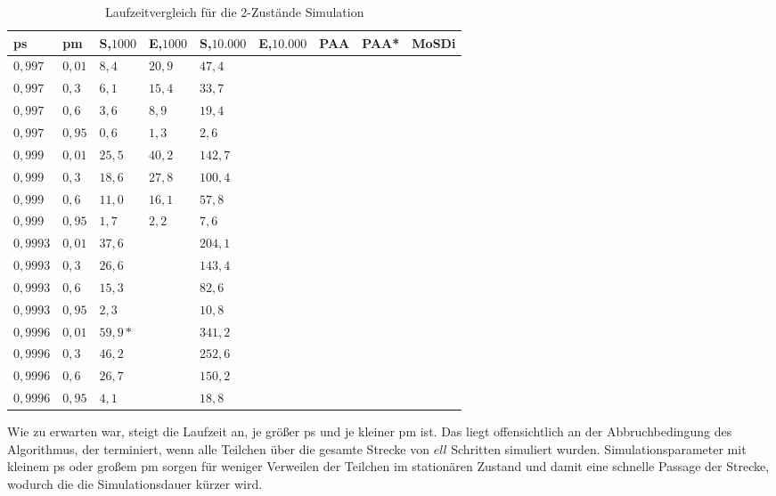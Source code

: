 \begin{table}[h]
\centering
\caption{Laufzeitvergleich für die 2-Zustände Simulation}
\label{2s_laufzeit}
\begin{tabular}{|l|l||l|l|l|l|l|l|l|} \hline
ps     & pm   & S,$1000$ & E,$1000$ & S,$10.000$ & E,$10.000$ & PAA & PAA* & MoSDi \\ \hline \hline
$0,997  $ & $ 0,01 $ & $ 8,4  $ & $ 20,9 $ & $ 47,4  $ & $  $ & $  $ & $ $ & $  $\\ \hline
$0,997  $ & $ 0,3  $ & $ 6,1  $ & $ 15,4 $ & $ 33,7  $ & $  $ & $  $ & $ $ & $  $\\ \hline
$0,997  $ & $ 0,6  $ & $ 3,6  $ & $ 8,9 $ & $ 19,4  $ & $  $ & $  $ & $ $ & $  $\\ \hline
$0,997  $ & $ 0,95 $ & $ 0,6  $ & $ 1,3 $ & $ 2,6   $ & $  $ & $  $ & $ $ & $  $\\ \hline
$0,999  $ & $ 0,01 $ & $ 25,5 $ & $ 40,2 $ & $ 142,7 $ & $  $ & $  $ & $ $ & $  $\\ \hline
$0,999  $ & $ 0,3  $ & $ 18,6 $ & $ 27,8 $ & $ 100,4 $ & $  $ & $  $ & $ $ & $  $\\ \hline
$0,999  $ & $ 0,6  $ & $ 11,0 $ & $ 16,1 $ & $ 57,8  $ & $  $ & $  $ & $ $ & $  $\\ \hline
$0,999  $ & $ 0,95 $ & $ 1,7  $ & $ 2,2 $ & $ 7,6   $ & $  $ & $  $ & $ $ & $  $\\ \hline
$0,9993 $ & $ 0,01 $ & $ 37,6 $ & $  $ & $ 204,1 $ & $  $ & $  $ & $ $ & $  $\\ \hline
$0,9993 $ & $ 0,3  $ & $ 26,6 $ & $  $ & $ 143,4 $ & $  $ & $  $ & $ $ & $  $\\ \hline
$0,9993 $ & $ 0,6  $ & $ 15,3 $ & $  $ & $ 82,6  $ & $  $ & $  $ & $ $ & $  $\\ \hline
$0,9993 $ & $ 0,95 $ & $ 2,3  $ & $  $ & $ 10,8  $ & $  $ & $  $ & $ $ & $  $\\ \hline
$0,9996 $ & $ 0,01 $ & $ 59,9*$ & $  $ & $ 341,2 $ & $  $ & $  $ & $ $ & $  $\\ \hline
$0,9996 $ & $ 0,3  $ & $ 46,2 $ & $  $ & $ 252,6 $ & $  $ & $  $ & $ $ & $  $\\ \hline
$0,9996 $ & $ 0,6  $ & $ 26,7 $ & $  $ & $ 150,2 $ & $  $ & $  $ & $ $ & $  $\\ \hline
$0,9996 $ & $ 0,95 $ & $ 4,1  $ & $  $ & $ 18,8  $ & $  $ & $  $ & $ $ & $  $\\ \hline
\end{tabular}
\end{table}

Wie zu erwarten war, steigt die Laufzeit an, je größer ps und je kleiner pm ist. Das liegt offensichtlich an der Abbruchbedingung des Algorithmus, der terminiert, wenn alle Teilchen über die gesamte Strecke von $ell$ Schritten simuliert wurden. Simulationsparameter mit kleinem ps oder großem pm sorgen für weniger Verweilen der Teilchen im stationären Zustand und damit eine schnelle Passage der Strecke, wodurch die die Simulationsdauer kürzer wird. 

